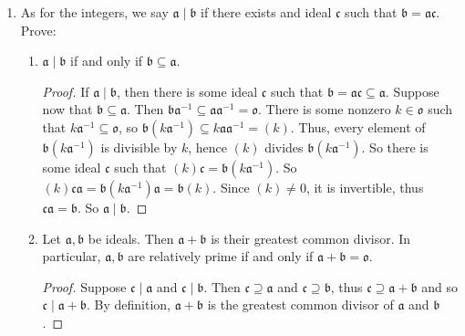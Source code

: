 \documentclass[10pt]{article}
\newcommand{\p}{\mathfrak{p}}
\renewcommand{\a}{\mathfrak{a}}
\renewcommand{\b}{\mathfrak{b}}
\renewcommand{\c}{\mathfrak{c}}
\renewcommand{\o}{\mathfrak{o}}
\begin{document}
\begin{enumerate}
\begin{proof}
Note also that, if $\a$ is an ideal of $S^{-1}R$, then $\a \cap R = \{a \mid a/s \in \a \text{ for some } s \in S\}$ is an ideal of $R$: the intersection of submodules is a submodule, and the $S^{-1}R$-action on $\a$ restricts to an action of $R$ on $\a$; hence both $\a$ and $R$ are $R$-modules.  Also, the extension $S^{-1}(\a \cap R)$ of $\a \cap R$ is $\a$, since if $a/s \in \a$ for some $s \in S$, then $a/s \in \a$ for all $s \in S$ because $\a$ is closed under multiplication by $S^{-1}R$.

Consider an ideal $\a$ of $\o_\p$.  Here, we will denote the extension of an ideal $\b$ by $\b_\p$.  $\a \cap \o$ has an inverse $(\a \cap \o)^{-1}$, which is a fractional ideal of $\o$.  So
$$
\a ((\a \cap \o)^{-1})_\p = ((\a \cap \o)(\a \cap \o)^{-1})_\p = \o_\p
$$
thus $((\a \cap \o)^{-1})_\p$ is the inverse of $\a$.  Now, if $\b$ is a fractional ideal of $\o_\p$, then there is some $c/s \in \o_\p$ such that $\frac{c}{s}\b$ is an ideal of $\o_\p$.  It has an inverse $\a$, which is a fractional ideal.  But then $\o_\p = (\frac{c}{s} \b) \a = \b (\frac{c}{s}\a)$, hence $\frac{c}{s}\a$ is the inverse of $\b$.  So all fractional ideals of $\o_\p$ are invertible, thus $\o_\p$ is Dedekind.

In exercise 18, we show (without using this result) that prime ideals of a Dedekind domain are maximal.  Thus, $\o_\p$ has a unique prime ideal.
\end{proof}

\item As for the integers, we say $\a \mid \b$ if there exists and ideal $\c$ such that $\b = \a\c$.  Prove:
\begin{enumerate}
\item $\a \mid \b$ if and only if $\b \subseteq \a$.
\begin{proof}
If $\a \mid \b$, then there is some ideal $\c$ such that $\b = \a\c \subseteq \a$.  Suppose now that $\b \subseteq \a$.  Then $\b \a^{-1} \subseteq \a \a^{-1} = \o$.  There is some nonzero $k \in \o$ such that $k \a^{-1} \subseteq \o$, so $\b(k\a^{-1}) \subseteq k\a\a^{-1} = (k)$.  Thus, every element of $\b(k\a^{-1})$ is divisible by $k$, hence $(k)$ divides $\b (k\a^{-1})$.  So there is some ideal $\c$ such that $(k)\c = \b(k\a^{-1})$.  So $(k)\c\a = \b(k\a^{-1})\a = \b(k)$.  Since $(k) \neq 0$, it is invertible, thus $\c\a = \b$.  So $\a \mid \b$.
\end{proof}
\item Let $\a,\b$ be ideals.  Then $\a + \b$ is their greatest common divisor.  In particular, $\a,\b$ are relatively prime if and only if $\a + \b = \o$.
\begin{proof}
Suppose $\c \mid \a$ and $\c \mid \b$.  Then $\c \supseteq \a$ and $\c \supseteq \b$, thus $\c \supseteq \a + \b$ and so $\c \mid \a + \b$.  By definition, $\a + \b$ is the greatest common divisor of $\a$ and $\b$.


\end{proof}
\end{enumerate}
\end{enumerate}
\end{document}
